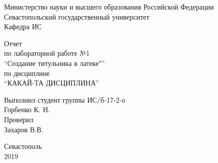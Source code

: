 \documentclass[a4paper,14pt]{extarticle}
\newcommand{\mylabnumber}{1}
\newcommand{\mylabtitle}{Создание титульника в латеке}
\newcommand{\mysubject}{Какай-та дисциплина}
\newcommand{\mylecturer}{Захаров В.В.}
\begin{document}
    \lstset{ %
        basicstyle=\footnotesize\ttfamily,
        breaklines=true,
        numbersep=5pt,
        tabsize=4,
        gobble=8,
        extendedchars=\true,
        keepspaces=\true,
        numbers=left,
        stringstyle=\ttfamily,
        showstringspaces=\false
    }


    \begin{titlepage}
        
        \thispagestyle{empty}
        
        \begin{center}
            
            Министерство науки и высшего образования Российской Федерации \\
            Севастопольский государственный университет \\
            Кафедра ИС
            
            \vfill

            Отчет \\
            по лабораторной работе №\mylabnumber \\
            \enquote{\mylabtitle"} \\
            по дисциплине \\
            \enquote{\MakeTextUppercase{\mysubject}}

        \end{center}

        \vspace{1cm}

        \noindent\hspace{7.5cm} Выполнил студент группы ИС/б-17-2-о \\
        \null\hspace{7.5cm} Горбенко К. Н. \\
        \null\hspace{7.5cm} Проверил \\
        \null\hspace{7.5cm} \mylecturer

        \vfill

        \begin{center}
            Севастополь \\
            2019
        \end{center}

    \end{titlepage}
\end{document}
